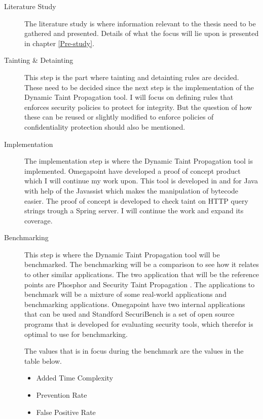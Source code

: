 \documentclass{../kththesis}
\begin{document}
\begin{description}  
	\item [Literature Study]
	The literature study is where information relevant to the thesis need to be gathered and presented. Details of what the focus will lie upon is presented in chapter \ref{Pre-study}.

	\item [Tainting \& Detainting]
	This step is the part where tainting and detainting rules are decided. These need to be decided since the next step is the implementation of the Dynamic Taint Propagation tool. I will focus on defining rules that enforces security policies to protect for integrity. But the question of how these can be reused or slightly modified to enforce policies of confidentiality protection should also be mentioned.

	\item [Implementation]
	The implementation step is where the Dynamic Taint Propagation tool is implemented. Omegapoint have developed a proof of concept product which I will continue my work upon. This tool is developed in and for Java with help of the Javassist \parencite{Javassist} which makes the manipulation of bytecode easier. The proof of concept is developed to check taint on HTTP query strings trough a Spring server. I will continue the work and expand its coverage.

	\item [Benchmarking]
	This step is where the Dynamic Taint Propagation tool will be benchmarked. The benchmarking will be a comparison to see how it relates to other similar applications. The two application that will be the reference points are Phosphor \parencite{phosphor} and Security Taint Propagation \parencite{securityTaint}. The applications to benchmark will be a mixture of some real-world applications and benchmarking applications. Omegapoint have two internal applications that can be used and Standford SecuriBench \parencite{securiBench} is a set of open source programs that is developed for evaluating security tools, which therefor is optimal to use for benchmarking.
	
	The values that is in focus during the benchmark are the values in the table below. 
	
	\begin{itemize}  
		\item Added Time Complexity		
		\item Prevention Rate 
		\item False Positive Rate
	\end{itemize}


\end{description}
\end{document}
